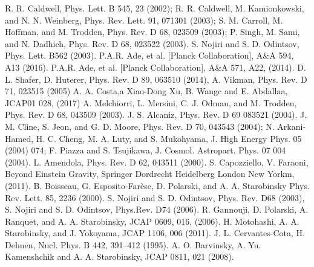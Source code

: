 \documentclass[a4paper,11pt]{article}
\begin{document}
\begin{thebibliography}{99}
R. R. Caldwell, Phys. Lett. B 545, 23 (2002); R. R.
Caldwell, M. Kamionkowski, and N. N. Weinberg, Phys.
Rev. Lett. 91, 071301 (2003); S. M. Carroll, M. Hoffman,
and M. Trodden, Phys. Rev. D 68, 023509 (2003); P.
Singh, M. Sami, and N. Dadhich, Phys. Rev. D 68,
023522 (2003).
S. Nojiri and S. D. Odintsov, Phys. Lett. B562 (2003).
P.A.R. Ade, et al. [Planck Collaboration], A\&A 594, A13 (2016).
P.A.R. Ade, et al. [Planck Collaboration],  A\&A
571, A22, (2014).
D. L. Shafer, D. Huterer, Phys. Rev. D 89, 063510 (2014), A. Vikman, Phys. Rev. D 71, 023515 (2005)
A. A. Costa,a Xiao-Dong Xu, B. Wangc and E. Abdallaa, JCAP01 028, (2017) 
A. Melchiorri, L. Mersini, C. J. Odman, and M.
Trodden, Phys. Rev. D 68, 043509 (2003).
J. S. Alcaniz, Phys. Rev. D 69 083521 (2004).
J. M. Cline, S. Jeon, and G. D. Moore, Phys. Rev. D 70,
043543 (2004); N. Arkani-Hamed, H. C. Cheng, M. A.
Luty, and S. Mukohyama, J. High Energy Phys. 05
(2004) 074; F. Piazza and S. Tsujikawa, J. Cosmol.
Astropart. Phys. 07 004 (2004).
L. Amendola, Phys. Rev. D 62, 043511 (2000).%
S. Capozziello, V. Faraoni, Beyond Einstein Gravity, Springer Dordrecht Heidelberg London New Yorkm, (2011).
 B. Boisseau, G. Esposito-Farèse, D. Polarski, and A. A. Starobinsky
Phys. Rev. Lett. 85, 2236 (2000).
S. Nojiri and S. D. Odintsov, Phys. Rev. D68 (2003), S. Nojiri and S. D. Odintsov, Phys.Rev. D74 (2006).
R. Gannouji, D. Polarski, A. Ranquet, and A. A. Starobinsky, JCAP 0609, 016, (2006).
H. Motohashi, A. A. Starobinsky, and J. Yokoyama, JCAP 1106, 006 (2011).
J. L. Cervantes-Cota, H. Dehnen, Nucl. Phys. B 442,  391–412 (1995).
A. O. Barvinsky, A. Yu. Kamenshchik and A. A. Starobinsky, JCAP 0811, 021 (2008).

\end{thebibliography}
\end{document}
